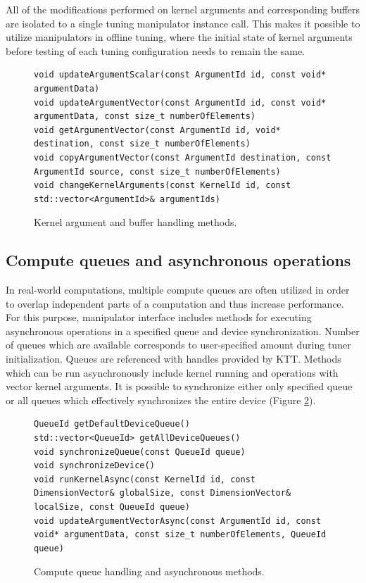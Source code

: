 \documentclass
[
    digital, %
    oneside, %
    table, %
    nolof, %
    nolot, %
    nocover %
]{fithesis3}
\begin{document}
All of the modifications performed on kernel arguments and corresponding buffers are isolated to a single tuning manipulator instance call. This makes
it possible to utilize manipulators in offline tuning, where the initial state of kernel arguments before testing of each tuning configuration needs to
remain the same.

\begin{figure}
\begin{adjustwidth}{-1cm}{-1cm}
\begin{lstlisting}
void updateArgumentScalar(const ArgumentId id, const void* argumentData)
void updateArgumentVector(const ArgumentId id, const void* argumentData, const size_t numberOfElements)
void getArgumentVector(const ArgumentId id, void* destination, const size_t numberOfElements)
void copyArgumentVector(const ArgumentId destination, const ArgumentId source, const size_t numberOfElements)
void changeKernelArguments(const KernelId id, const std::vector<ArgumentId>& argumentIds)
\end{lstlisting}
\caption{Kernel argument and buffer handling methods.}
\label{ktt-manipulator-buffer-methods}
\end{adjustwidth}
\end{figure}

\subsection{Compute queues and asynchronous operations}
In real-world computations, multiple compute queues are often utilized in order to overlap independent parts of a computation and thus increase
performance. For this purpose, manipulator interface includes methods for executing asynchronous operations in a specified queue and device synchronization.
Number of queues which are available corresponds to user-specified amount during tuner initialization. Queues are referenced with handles provided by KTT.
Methods which can be run asynchronously include kernel running and operations with vector kernel arguments. It is possible to synchronize either only
specified queue or all queues which effectively synchronizes the entire device (Figure \ref{ktt-manipulator-asynchronous-methods}).

\begin{figure}
\begin{adjustwidth}{-1cm}{-1cm}
\begin{lstlisting}
QueueId getDefaultDeviceQueue()
std::vector<QueueId> getAllDeviceQueues()
void synchronizeQueue(const QueueId queue)
void synchronizeDevice()
void runKernelAsync(const KernelId id, const DimensionVector& globalSize, const DimensionVector& localSize, const QueueId queue)
void updateArgumentVectorAsync(const ArgumentId id, const void* argumentData, const size_t numberOfElements, QueueId queue)
\end{lstlisting}
\caption{Compute queue handling and asynchronous methods.}
\label{ktt-manipulator-asynchronous-methods}
\end{adjustwidth}
\end{figure}
\end{document}
